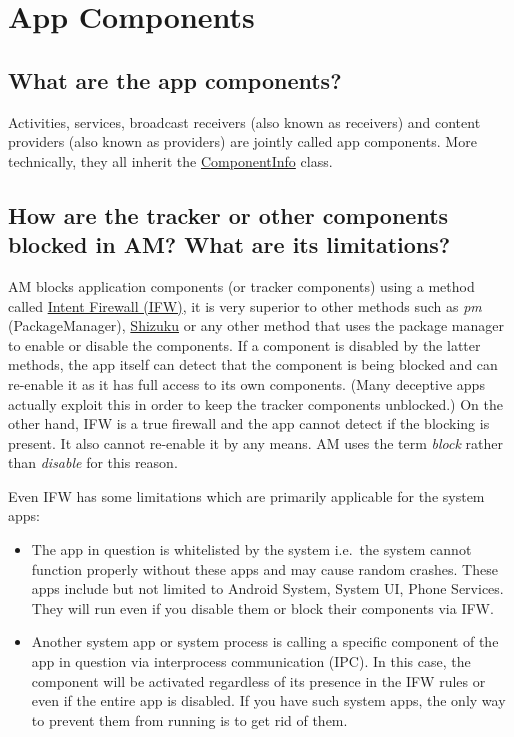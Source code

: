 \section{App Components}\label{sec:faq:app-components}

\subsection{What are the app components?}\label{subsec:faq:what-are-app-components}
Activities, services, broadcast receivers (also known as receivers) and content providers (also known as providers) are
jointly called app components. More technically, they all inherit the
\href{https://developer.android.com/reference/android/content/pm/ComponentInfo}{ComponentInfo} class.

\subsection{How are the tracker or other components blocked in AM? What are its limitations?}
AM blocks application components (or tracker components) using a method called
\href{https://carteryagemann.com/pages/android-intent-firewall.html}{Intent Firewall (IFW)}, it is very superior to
other methods such as \textit{pm} (PackageManager), \href{https://github.com/RikkaApps/Shizuku}{Shizuku} or any other
method that uses the package manager to enable or disable the components. If a component is disabled by the latter
methods, the app itself can detect that the component is being blocked and can re-enable it as it has full access to its
own components. (Many deceptive apps actually exploit this in order to keep the tracker components unblocked.) On the
other hand, IFW is a true firewall and the app cannot detect if the blocking is present. It also cannot re-enable it by
any means. AM uses the term \textit{block} rather than \textit{disable} for this reason.

Even IFW has some limitations which are primarily applicable for the system apps:
\begin{itemize}
    \item The app in question is whitelisted by the system i.e.\ the system cannot function properly without these apps
    and may cause random crashes. These apps include but not limited to Android System, System UI, Phone Services. They
    will run even if you disable them or block their components via IFW\@.

    \item Another system app or system process is calling a specific component of the app in question via interprocess
    communication (IPC). In this case, the component will be activated regardless of its presence in the IFW rules or
    even if the entire app is disabled. If you have such system apps, the only way to prevent them from running is to
    get rid of them.
\end{itemize}

